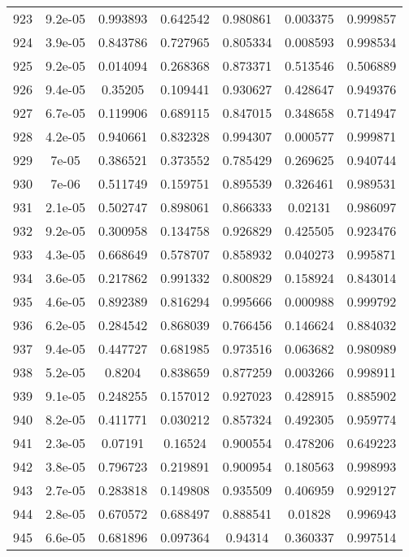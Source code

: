 \begin{table}
\begin{tabular}{c|c|c|c|c|c|c}
923 & 9.2e-05 & 0.993893 & 0.642542 & 0.980861 & 0.003375 & 0.999857\\
924 & 3.9e-05 & 0.843786 & 0.727965 & 0.805334 & 0.008593 & 0.998534\\
925 & 9.2e-05 & 0.014094 & 0.268368 & 0.873371 & 0.513546 & 0.506889\\
926 & 9.4e-05 & 0.35205 & 0.109441 & 0.930627 & 0.428647 & 0.949376\\
927 & 6.7e-05 & 0.119906 & 0.689115 & 0.847015 & 0.348658 & 0.714947\\
928 & 4.2e-05 & 0.940661 & 0.832328 & 0.994307 & 0.000577 & 0.999871\\
929 & 7e-05 & 0.386521 & 0.373552 & 0.785429 & 0.269625 & 0.940744\\
930 & 7e-06 & 0.511749 & 0.159751 & 0.895539 & 0.326461 & 0.989531\\
931 & 2.1e-05 & 0.502747 & 0.898061 & 0.866333 & 0.02131 & 0.986097\\
932 & 9.2e-05 & 0.300958 & 0.134758 & 0.926829 & 0.425505 & 0.923476\\
933 & 4.3e-05 & 0.668649 & 0.578707 & 0.858932 & 0.040273 & 0.995871\\
934 & 3.6e-05 & 0.217862 & 0.991332 & 0.800829 & 0.158924 & 0.843014\\
935 & 4.6e-05 & 0.892389 & 0.816294 & 0.995666 & 0.000988 & 0.999792\\
936 & 6.2e-05 & 0.284542 & 0.868039 & 0.766456 & 0.146624 & 0.884032\\
937 & 9.4e-05 & 0.447727 & 0.681985 & 0.973516 & 0.063682 & 0.980989\\
938 & 5.2e-05 & 0.8204 & 0.838659 & 0.877259 & 0.003266 & 0.998911\\
939 & 9.1e-05 & 0.248255 & 0.157012 & 0.927023 & 0.428915 & 0.885902\\
940 & 8.2e-05 & 0.411771 & 0.030212 & 0.857324 & 0.492305 & 0.959774\\
941 & 2.3e-05 & 0.07191 & 0.16524 & 0.900554 & 0.478206 & 0.649223\\
942 & 3.8e-05 & 0.796723 & 0.219891 & 0.900954 & 0.180563 & 0.998993\\
943 & 2.7e-05 & 0.283818 & 0.149808 & 0.935509 & 0.406959 & 0.929127\\
944 & 2.8e-05 & 0.670572 & 0.688497 & 0.888541 & 0.01828 & 0.996943\\
945 & 6.6e-05 & 0.681896 & 0.097364 & 0.94314 & 0.360337 & 0.997514\\
\end{tabular}
\end{table}
